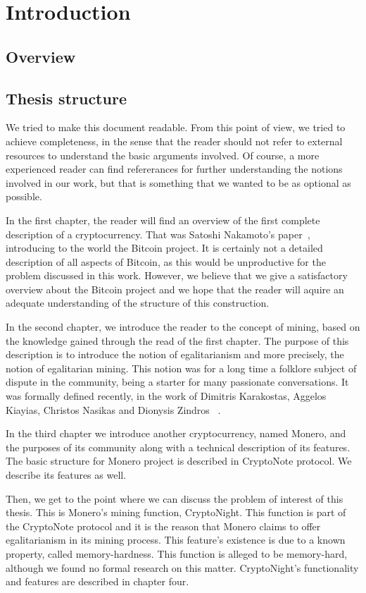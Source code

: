 \setcounter{chapter}{-1}
\chapter{Introduction}
%
\section{Overview}
%
%
%
\section{Thesis structure}
We tried to make this document readable. From this point of view, we tried to achieve completeness, in the sense that the reader should not refer to external resources to understand the basic arguments involved. Of course, a more experienced reader can find refererances for further understanding the notions involved in our work, but that is something that we wanted to be as optional as possible.

In the first chapter, the reader will find an overview of the first complete description of a cryptocurrency. That was Satoshi Nakamoto's paper~\cite{Nakamoto_bitcoin:a}, introducing to the world the Bitcoin project. It is certainly not a detailed description of all aspects of Bitcoin, as this would be unproductive for the problem discussed in this work. However, we believe that we give a satisfactory overview about the Bitcoin project and we hope that the reader will aquire an adequate understanding of the structure of this construction.

In the second chapter, we introduce the reader to the concept of mining, based on the knowledge gained through the read of the first chapter. The purpose of this description is to introduce the notion of egalitarianism and more precisely, the notion of egalitarian mining. This notion was for a long time a folklore subject of dispute in the community, being a starter for many passionate conversations. It was formally defined recently, in the work of Dimitris Karakostas, Aggelos Kiayias, Christos Nasikas and Dionysis Zindros ~\cite{egalitarianism}.

In the third chapter we introduce another cryptocurrency, named Monero, and the purposes of its community along with a technical description of its features. The basic structure for Monero project is described in CryptoNote protocol. We describe its features as well.

Then, we get to the point where we can discuss the problem of interest of this thesis. This is Monero's mining function, CryptoNight. This function is part of the CryptoNote protocol and it is the reason that Monero claims to offer egalitarianism in its mining process. This feature's existence is due to a known property, called memory-hardness. This function is alleged to be memory-hard, although we found no formal research on this matter. CryptoNight's functionality and features are described in chapter four.

